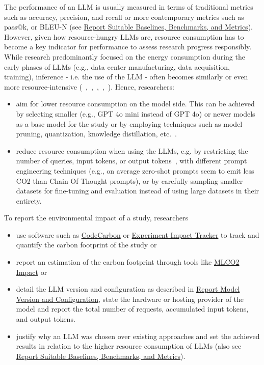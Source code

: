 The performance of an LLM is usually measured in terms of traditional metrics such as accuracy, precision, and recall or more contemporary metrics such as pass@k, or BLEU-N (see \href{/guidelines/report-baselines-benchmarks-and-metrics}{Report Suitable Baselines, Benchmarks, and Metrics}). However, given how resource-hungry LLMs are, resource consumption has to become a key indicator for performance to assess research progress responsibly. 
While research predominantly focused on the energy consumption during the early phases of LLMs (e.g., data center manufacturing, data acquisition, training), inference - i.e. the use of the LLM - often becomes similarly or even more resource-intensive (~\cite{de2023growing},~\cite{DBLP:conf/mlsys/WuRGAAMCBHBGGOM22},~\cite{DBLP:journals/corr/abs-2410-02950},~\cite{JIANG2024202},~\cite{mitu2024hidden}).
Hence, researchers:
\begin{itemize}
  \item \should aim for lower resource consumption on the model side. This can be achieved by selecting smaller (e.g., GPT 4o mini instead of GPT 4o) or newer models as a base model for the study or by employing techniques such as model pruning, quantization, knowledge distillation, etc.~\cite{mitu2024hidden}.
  \item \should reduce resource consumption when using the LLMs, e.g. by restricting the number of queries, input tokens, or output tokens~\cite{mitu2024hidden}, with different prompt engineering techniques (e.g., on average zero-shot prompts seem to emit less CO2 than Chain Of Thought prompts), or by carefully sampling smaller datasets for fine-tuning and evaluation instead of using large datasets in their entirety.
\end{itemize}
To report the environmental impact of a study, researchers
\begin{itemize}
    \item \should use software such as \href{https://github.com/mlco2/codecarbon}{CodeCarbon} or \href{experiment-impact-tracker}{Experiment Impact Tracker} to track and quantify the carbon footprint of the study or
    \item \should report an estimation of the carbon footprint through tools like \href{https://mlco2.github.io/impact/#about}{MLCO2 Impact} or
    \item \should detail the LLM version and configuration as described in \href{/guidelines/report-version-and-configuration}{Report Model Version and Configuration}, state the hardware or hosting provider of the model and report the total number of requests, accumulated input tokens, and output tokens.
    \item \must justify why an LLM was chosen over existing approaches and set the achieved results in relation to the higher resource consumption of LLMs (also see \href{/guidelines/report-baselines-benchmarks-and-metrics}{Report Suitable Baselines, Benchmarks, and Metrics}).
\end{itemize}

